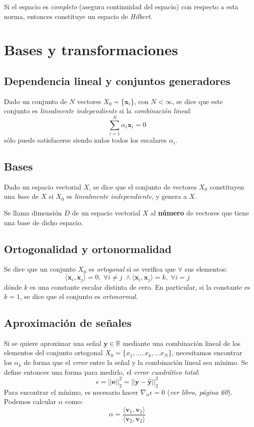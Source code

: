 \documentclass[10pt,a4paper]{book}
\begin{document}
Si el espacio es \textit{completo} (asegura continuidad del espacio) con respecto a esta norma, entonces constituye un espacio de \textit{Hilbert}.

\section{Bases y transformaciones}
\subsection{Dependencia lineal y conjuntos generadores}
Dado un conjunto de $N$ vectores $X_0=$\{$\mathbf{x}_i$\}, con $N<\infty$, se dice que este conjunto es \textit{linealmente independiente} si la \textit{combinación lineal}:
\[\sum_{i=1}^N \alpha_i \mathbf{x}_i =0\]
sólo puede satisfacerse siendo nulos todos los escalares $\alpha_i$.

\subsection{Bases}
Dado un espacio vectorial $X$, se dice que el conjunto de vectores $X_0$ constituyen una \textit{base} de $X$ si $X_0$ es \textit{linealmente independiente}, y genera a $X$.

Se llama dimensión $D$ de un espacio vectorial $X$ al \textbf{número} de vectores que tiene una base de dicho espacio.

\subsection{Ortogonalidad y ortonormalidad}
Se dice que un conjunto $X_0$ es \textit{ortogonal} si se verifica que $\forall$ sus elementos:
\[\langle \mathbf{x}_i, \mathbf{x}_j \rangle = 0, \; \forall i \neq j \; 
\land 
\langle \mathbf{x}_i, \mathbf{x}_j \rangle = k, \; \forall i = j \]
dónde $k$ es una constante escalar distinta de cero. En particular, si la constante es $k=1$, se dice que el conjunto es \textit{ortonormal}.

\subsection{Aproximación de señales}
Si se quiere aproximar una señal $\mathbf{y} \in \mathbb{R}$ mediante una combinación lineal de los elementos del conjunto ortogonal $X_0=$\{$x_1,...,x_k,...x_N$\}, necesitamos encontrar los $\alpha_k$ de forma que el \textit{error} entre la señal y la combinación lineal sea mínimo. Se define entonces una forma para medirlo, el \textit{error cuadrático total}:
\[\epsilon=||\mathbf{e}||_2^2=||\mathbf{y}-\hat{\mathbf{y}}||_2^2\]
Para encontrar el mínimo, es necesario hacer $\nabla_\alpha \epsilon=0$ (\textit{ver libro, página 60}).
Podemos calcular $\alpha$ como:
\[\alpha = \frac{\langle \mathbf{v}_1,\mathbf{v}_2 \rangle}{\langle \mathbf{v}_2,\mathbf{v}_2 \rangle}\]
\end{document}
